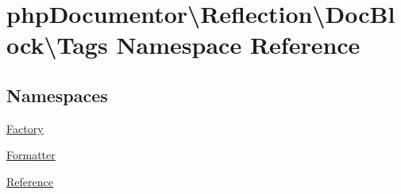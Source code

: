 \hypertarget{namespacephp_documentor_1_1_reflection_1_1_doc_block_1_1_tags}{}\section{php\+Documentor\textbackslash{}Reflection\textbackslash{}Doc\+Block\textbackslash{}Tags Namespace Reference}
\label{namespacephp_documentor_1_1_reflection_1_1_doc_block_1_1_tags}
\subsection*{Namespaces}
\begin{DoxyCompactItemize}
\item 
 \mbox{\hyperlink{namespacephp_documentor_1_1_reflection_1_1_doc_block_1_1_tags_1_1_factory}{Factory}}
\item 
 \mbox{\hyperlink{namespacephp_documentor_1_1_reflection_1_1_doc_block_1_1_tags_1_1_formatter}{Formatter}}
\item 
 \mbox{\hyperlink{namespacephp_documentor_1_1_reflection_1_1_doc_block_1_1_tags_1_1_reference}{Reference}}
\end{DoxyCompactItemize}
